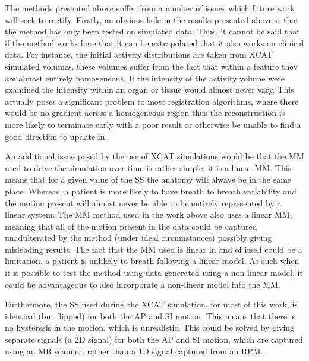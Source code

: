         The methods presented above suffer from a number of issues which future work will seek to rectify. Firstly, an obvious hole in the results presented above is that the method has only been tested on simulated data. Thus, it cannot be said that if the method works here that it can be extrapolated that it also works on clinical data. For instance, the initial activity distributions are taken from \gls{XCAT} simulated volumes, these volumes suffer from the fact that within a feature they are almost entirely homogeneous. If the intensity of the activity volume were examined the intensity within an organ or tissue would almost never vary. This actually poses a significant problem to most registration algorithms, where there would be no gradient across a homogeneous region thus the reconstruction is more likely to terminate early with a poor result or otherwise be unable to find a good direction to update in.
        
        An additional issue posed by the use of \gls{XCAT} simulations would be that the \gls{MM} used to drive the simulation over time is rather simple, it is a linear \gls{MM}. This means that for a given value of the \gls{SS} the anatomy will always be in the same place. Whereas, a patient is more likely to have breath to breath variability and the motion present will almost never be able to be entirely represented by a linear system. The \gls{MM} method used in the work above also uses a linear \gls{MM}, meaning that all of the motion present in the data could be captured unadulterated by the method (under ideal circumstances) possibly giving misleading results. The fact that the \gls{MM} used is linear in and of itself could be a limitation, a patient is unlikely to breath following a linear model. As such when it is possible to test the method using data generated using a non-linear model, it could be advantageous to also incorporate a non-linear model into the \gls{MM}.
        
        Furthermore, the \gls{SS} used during the \gls{XCAT} simulation, for most of this work, is identical (but flipped) for both the \gls{AP} and \gls{SI} motion. This means that there is no hysteresis in the motion, which is unrealistic. This could be solved by giving separate signals (a \gls{2D} signal) for both the \gls{AP} and \gls{SI} motion, which are captured using an \gls{MR} scanner, rather than a \gls{1D} signal captured from an \gls{RPM}.
        
